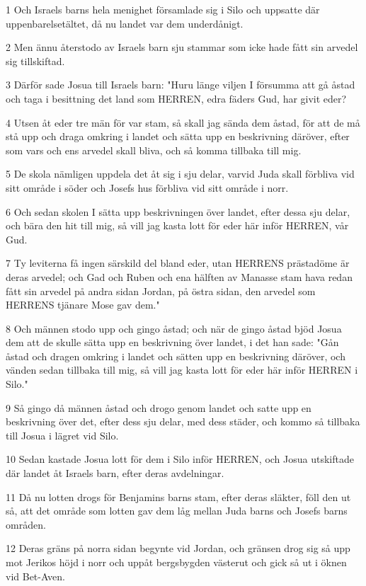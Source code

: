 \par 1 Och Israels barns hela menighet församlade sig i Silo och uppsatte där uppenbarelsetältet, då nu landet var dem underdånigt.
\par 2 Men ännu återstodo av Israels barn sju stammar som icke hade fått sin arvedel sig tillskiftad.
\par 3 Därför sade Josua till Israels barn: "Huru länge viljen I försumma att gå åstad och taga i besittning det land som HERREN, edra fäders Gud, har givit eder?
\par 4 Utsen åt eder tre män för var stam, så skall jag sända dem åstad, för att de må stå upp och draga omkring i landet och sätta upp en beskrivning däröver, efter som vars och ens arvedel skall bliva, och så komma tillbaka till mig.
\par 5 De skola nämligen uppdela det åt sig i sju delar, varvid Juda skall förbliva vid sitt område i söder och Josefs hus förbliva vid sitt område i norr.
\par 6 Och sedan skolen I sätta upp beskrivningen över landet, efter dessa sju delar, och bära den hit till mig, så vill jag kasta lott för eder här inför HERREN, vår Gud.
\par 7 Ty leviterna få ingen särskild del bland eder, utan HERRENS prästadöme är deras arvedel; och Gad och Ruben och ena hälften av Manasse stam hava redan fått sin arvedel på andra sidan Jordan, på östra sidan, den arvedel som HERRENS tjänare Mose gav dem."
\par 8 Och männen stodo upp och gingo åstad; och när de gingo åstad bjöd Josua dem att de skulle sätta upp en beskrivning över landet, i det han sade: "Gån åstad och dragen omkring i landet och sätten upp en beskrivning däröver, och vänden sedan tillbaka till mig, så vill jag kasta lott för eder här inför HERREN i Silo."
\par 9 Så gingo då männen åstad och drogo genom landet och satte upp en beskrivning över det, efter dess sju delar, med dess städer, och kommo så tillbaka till Josua i lägret vid Silo.
\par 10 Sedan kastade Josua lott för dem i Silo inför HERREN, och Josua utskiftade där landet åt Israels barn, efter deras avdelningar.
\par 11 Då nu lotten drogs för Benjamins barns stam, efter deras släkter, föll den ut så, att det område som lotten gav dem låg mellan Juda barns och Josefs barns områden.
\par 12 Deras gräns på norra sidan begynte vid Jordan, och gränsen drog sig så upp mot Jerikos höjd i norr och uppåt bergsbygden västerut och gick så ut i öknen vid Bet-Aven.
